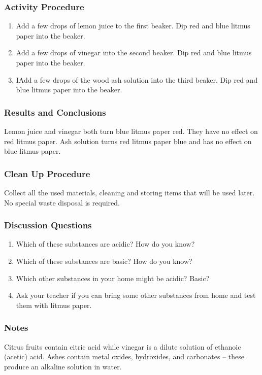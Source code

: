 \subsubsection*{Activity Procedure}
\begin{enumerate}
\item{Add a few drops of lemon juice to the first beaker. Dip red and blue litmus paper into the beaker.}
\item{Add a few drops of vinegar into the second beaker. Dip red and blue litmus paper into the beaker.}
\item{IAdd a few drops of the wood ash solution into the third beaker. Dip red and blue litmus paper into the beaker.}
\end{enumerate}

\subsubsection*{Results and Conclusions}
Lemon juice and vinegar both turn blue litmus paper red. They have no effect on red litmus paper. Ash solution turns red litmus paper blue and has no effect on blue litmus paper.

\subsubsection*{Clean Up Procedure}
Collect all the used materials, cleaning and storing items that will be used later.  No special waste disposal is required.

\subsubsection*{Discussion Questions}
\begin{enumerate}
\item{Which of these substances are acidic? How do you know?}
\item{Which of these substances are basic? How do you know?}
\item{Which other substances in your home might be acidic? Basic?}
\item{Ask your teacher if you can bring some other substances from home and test them with litmus paper.}
\end{enumerate}

\subsubsection*{Notes}
Citrus fruits contain citric acid while vinegar is a dilute solution of ethanoic (acetic) acid. Ashes contain metal oxides, hydroxides, and carbonates -- these produce an alkaline solution in water.

